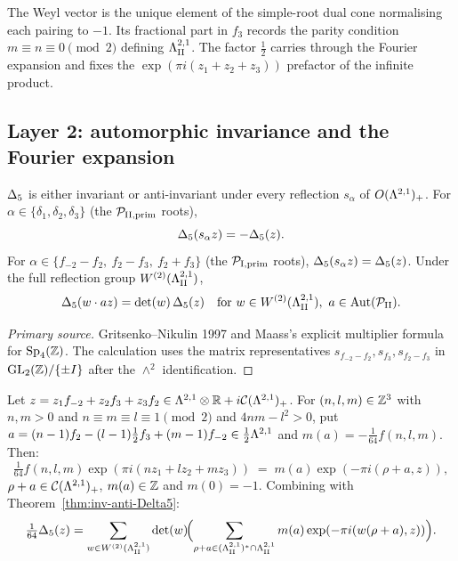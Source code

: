 \begin{remark}
The Weyl vector is the unique element of the simple-root dual cone
normalising each pairing to $-1$. Its fractional part in $f_3$ records
the parity condition $m \equiv n \equiv 0 \pmod 2$ defining $\Lambda^{2,1}_{\mathrm{II}}$.
The factor $\tfrac{1}{2}$ carries through the Fourier expansion and
fixes the $\exp(\pi i(z_1+z_2+z_3))$ prefactor of the infinite product.
\end{remark}

\subsection{Layer 2: automorphic invariance and the Fourier expansion}
\label{subsec:automorphic}

\begin{theorem}
\label{thm:inv-anti-Delta5}
$\Delta_5$ is either invariant or anti-invariant under every
reflection $s_\alpha$ of $O(\Lambda^{2,1})_+$. For $\alpha \in \{\delta_1, \delta_2, \delta_3\}$
(the $\mathcal{P}_{\mathrm{II},\mathrm{prim}}$ roots),
\[
  \Delta_5(s_\alpha z) = -\Delta_5(z).
\]
For $\alpha \in \{f_{-2} - f_2,\ f_2 - f_3,\ f_2 + f_3\}$ (the $\mathcal{P}_{\mathrm{I},\mathrm{prim}}$ roots),
$\Delta_5(s_\alpha z) = \Delta_5(z)$. Under the full reflection group
$W^{(2)}(\Lambda^{2,1}_{\mathrm{II}})$,
\[
  \Delta_5(w \cdot a z) = \det(w)\,\Delta_5(z)\quad\text{for } w \in W^{(2)}(\Lambda^{2,1}_{\mathrm{II}}),\ a \in \mathrm{Aut}(\mathcal{P}_{\mathrm{II}}).
\]
\end{theorem}
\begin{proof}[Primary source]
Gritsenko--Nikulin 1997 and Maass's explicit multiplier formula for
$\mathrm{Sp}_4(\mathbb{Z})$. The calculation uses the matrix representatives
$s_{f_{-2}-f_2}, s_{f_3}, s_{f_2-f_3}$ in
$\mathrm{GL}_2(\mathbb{Z})/\{\pm I\}$ after the $\wedge^2$ identification.
\end{proof}

\begin{proposition}
\label{prop:fourier-rho}
Let $z = z_1 f_{-2} + z_2 f_3 + z_3 f_2 \in \Lambda^{2,1} \otimes \mathbb{R} + i\mathcal{C}(\Lambda^{2,1})_+$.
For $(n, l, m) \in \mathbb{Z}^3$ with $n, m > 0$ and $n \equiv m \equiv l \equiv 1 \pmod 2$
and $4nm - l^2 > 0$, put
$a = (n-1)f_2 - (l-1)\tfrac{1}{2}f_3 + (m-1)f_{-2} \in \tfrac{1}{2}\Lambda^{2,1}$
and $m(a) = -\tfrac{1}{64} f(n, l, m)$. Then:
\[
  \tfrac{1}{64} f(n,l,m) \exp(\pi i (n z_1 + l z_2 + m z_3))
  \;=\; m(a)\exp(-\pi i(\rho + a, z)),
\]
$\rho + a \in \mathcal{C}(\Lambda^{2,1})_+$, $m(a) \in \mathbb{Z}$ and
$m(0) = -1$. Combining with Theorem~\ref{thm:inv-anti-Delta5}:
\[
  \tfrac{1}{64}\Delta_5(z)
  = \sum_{w \in W^{(2)}(\Lambda^{2,1}_{\mathrm{II}})} \det(w)\!\Bigl(\sum_{\rho + a \in (\Lambda^{2,1}_{\mathrm{II}})^{*} \cap \Lambda^{2,1}_{\mathrm{II}}} m(a)\exp(-\pi i(w(\rho+a), z))\Bigr).
\]
\end{proposition}

